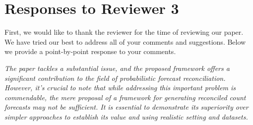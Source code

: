 \documentclass[11pt,a4paper]{article}
\newcommand{\RE}[2][Re:~]{{\color{blue}\textbf{#1}#2}}
\begin{document}
\newpage
\section*{Responses to Reviewer 3}\label{reviewer-3-comments}

\RE[]{First, we would like to thank the reviewer for the time of reviewing our paper. We have tried our best to address all of your comments and suggestions. Below we provide a point-by-point response to your comments.}


\textit{The paper tackles a substantial issue, and the proposed framework offers a significant contribution to the field of probabilistic forecast reconciliation. However, it's crucial to note that while addressing this important problem is commendable, the mere proposal of a framework for generating reconciled count forecasts may not be sufficient. It is essential to demonstrate its superiority over simpler approaches to establish its value and using realistic setting and datasets.}
\end{document}
